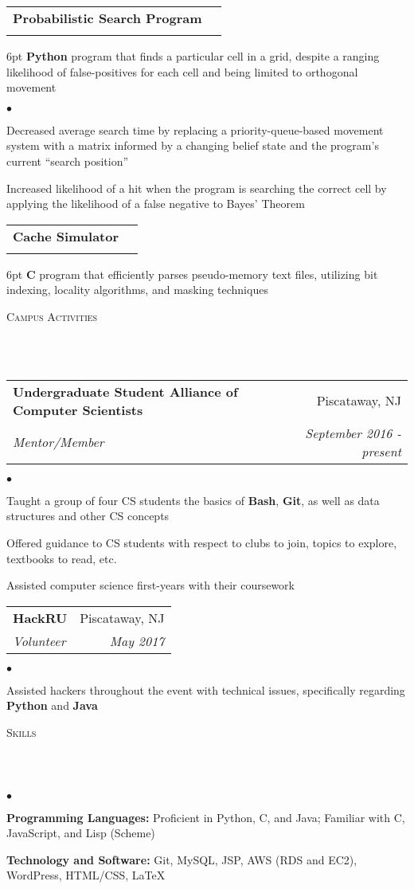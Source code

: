 \documentclass[12pt]{article}
\makeatletter
\newcommand{\lineunder}{
	\vspace*{-8pt} \\ 
	\hspace*{-18pt} 
	\hrulefill \\
}
\newcommand{\header}[1]{
	\vspace*{2pt}
	{\hspace*{-14pt}\vspace*{6pt} \textsc{#1}} 
	\vspace*{-6pt} 
	\lineunder
}
\newenvironment{achievements}{
  \begin{list}{$\bullet$}{
  	\topsep 0pt \itemsep -4pt}}
  	{\vspace*{2pt}\end{list}
}
\def\cpp{
	{\hspace{-0.25em}C\nolinebreak[4]\hspace{-.05em}\raisebox{.4ex}{\tiny		\bf ++}}}
\newcommand{\subheading}[4]{
 	\vspace{5pt}
    	\begin{tabular*}{1.01\textwidth}{l@{\extracolsep{\fill}}r}
      		\textbf{#1} & #2 \\
      		\textit{\small#3} & \textit{\small #4} \\
    	\end{tabular*}\vspace{-5pt}
}
\makeatother
\begin{document}
\subheading{Probabilistic Search Program}{}{}{}
	\vspace{-15pt}	
	\begin{adjustwidth}{6pt}{}
	\textbf{Python} program that finds a particular cell in a grid, despite a ranging likelihood of false-positives for each cell and being limited to orthogonal movement
	\end{adjustwidth}
	\begin{achievements}
		\item Decreased average search time by replacing a priority-queue-based movement system with a matrix informed by a changing belief state and the program's current \textquotedblleft search position\textquotedblright
		\item Increased likelihood of a hit when the program is searching the correct cell by applying the likelihood of a false negative to Bayes' Theorem
	\end{achievements}
	
\subheading{Cache Simulator}{}{}{}
	\vspace{-15pt}
	\begin{adjustwidth}{6pt}{}
	\textbf{C} program that efficiently parses pseudo-memory text files, utilizing bit indexing, locality algorithms, and masking techniques
	\end{adjustwidth}
\vspace*{4pt}


\header{Campus Activities}

\subheading
	{Undergraduate Student Alliance of Computer Scientists}{Piscataway, NJ}
	{Mentor/Member}{September 2016 - \textit{present}}
	\begin{achievements}
		\item Taught a group of four CS students the basics of \textbf{Bash}, \textbf{Git}, as well as data structures and other CS concepts
		\item Offered guidance to CS students with respect to clubs to join, topics to explore, textbooks to read, etc.
		\item Assisted computer science first-years with their coursework
	\end{achievements}
	
\subheading
	{HackRU}{Piscataway, NJ}
	{Volunteer}{May 2017}
	\begin{achievements}
		\item Assisted hackers throughout the event with technical issues, specifically regarding \textbf{Python} and \textbf{Java}
	\end{achievements}

	
\header{Skills}
	\begin{achievements}
		\item{\bf Programming Languages:} Proficient in Python, C, and Java; Familiar with \cpp, JavaScript, and Lisp (Scheme)
		\item{\bf Technology and Software:} Git, MySQL, JSP, AWS (RDS and EC2), WordPress, HTML/CSS, \LaTeX
	\end{achievements}
\end{document}
